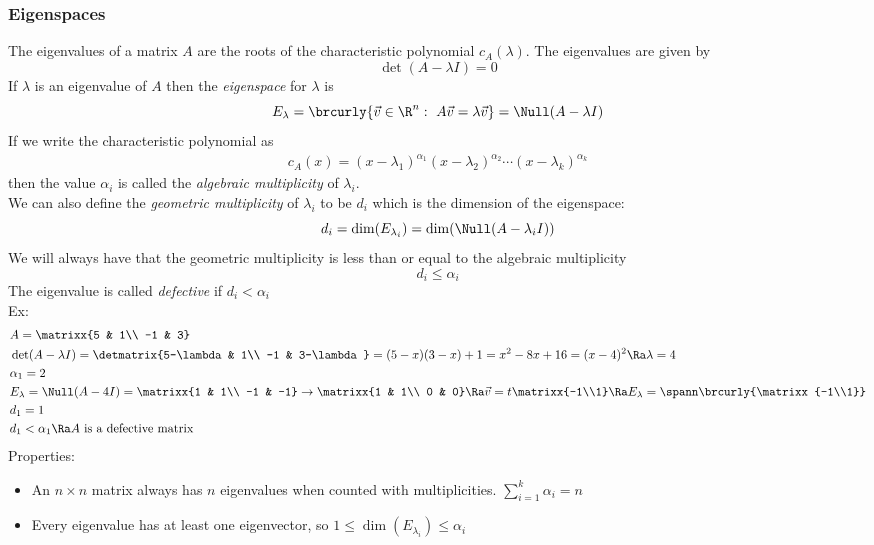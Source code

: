 \subsubsection{Eigenspaces}
The eigenvalues of a matrix $A$ are the roots of the characteristic polynomial $c_A(\lambda)$. The eigenvalues are given by
$$\det(A-\lambda I)=0$$
If $\lambda$ is an eigenvalue of $A$ then the \textit{eigenspace} for $\lambda$ is
$$E_\lambda=\brcurly{\vec{v}\in\R^n:\ A\vec{v}=\lambda\vec{v}}=\Null(A-\lambda I)$$
If we write the characteristic polynomial as
\begin{align*}
    c_A(x)=(x-\lambda_1)^{\alpha_1}(x-\lambda_2)^{\alpha_2}\cdots(x-\lambda_k)^{\alpha_k}
\end{align*}
then the value $\alpha_i$ is called the \textit{algebraic multiplicity} of $\lambda_i$.\\
We can also define the \textit{geometric multiplicity} of $\lambda_i$ to be $d_i$ which is the dimension of the eigenspace:
$$d_i=\dim(E_{\lambda_i})=\dim(\Null(A-\lambda_iI))$$
We will always have that the geometric multiplicity is less than or equal to the algebraic multiplicity
$$d_i\leq\alpha_i$$
The eigenvalue is called \textit{defective} if $d_i<\alpha_i$\\
Ex:
\begin{align*}
    &A=\matrixx{5 & 1\\ -1 & 3}\\
    &\det(A-\lambda I)=\detmatrix{5-\lambda & 1\\ -1 & 3-\lambda}=(5-x)(3-x)+1=x^2-8x+16=(x-4)^2\Ra \lambda=4\\
    &\alpha_1=2\\
    &E_{\lambda}=\Null(A-4I)=\matrixx{1 & 1\\ -1 & -1}\to\matrixx{1 & 1\\ 0 & 0}\Ra \vec{v}=t\matrixx{-1\\1}\Ra E_\lambda=\spann\brcurly{\matrixx{-1\\1}}\\
    &d_1=1\\
    &d_1<\alpha_1\Ra \text{$A$ is a defective matrix}
\end{align*}
Properties:
\begin{itemize}
    \item An $n\times n$ matrix always has $n$ eigenvalues when counted with multiplicities. $\sum\limits_{i=1}^k\alpha_i=n$
    \item Every eigenvalue has at least one eigenvector, so $1\leq\dim(E_{\lambda_i})\leq \alpha_i$
\end{itemize}

